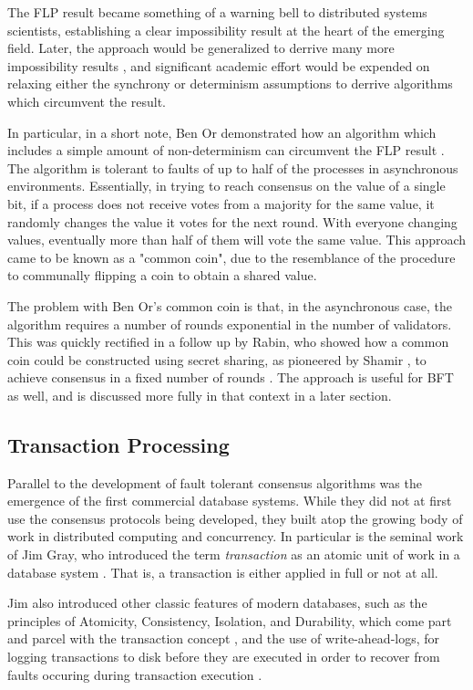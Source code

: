 The FLP result became something of a warning bell to distributed systems scientists, 
establishing a clear impossibility result at the heart of the emerging field.
Later, the approach would be generalized to derrive many more impossibility results \cite{impossibility},
and significant academic effort would be expended on relaxing either the synchrony or determinism assumptions to derrive algorithms which circumvent the result.

In particular, in a short note, 
Ben Or demonstrated how an algorithm which includes a simple amount of non-determinism can circumvent the FLP result \cite{free-choice}.
The algorithm is tolerant to faults of up to half of the processes in asynchronous environments.
Essentially, in trying to reach consensus on the value of a single bit, 
if a process does not receive votes from a majority for the same value, it randomly changes the value it votes for the next round.
With everyone changing values, eventually more than half of them will vote the same value.
This approach came to be known as a "common coin", 
due to the resemblance of the procedure to communally flipping a coin to obtain a shared value.

The problem with Ben Or's common coin is that, in the asynchronous case,
the algorithm requires a number of rounds exponential in the number of validators.
This was quickly rectified in a follow up by Rabin, who showed how a common coin
could be constructed using secret sharing, as pioneered by Shamir \cite{shamir1979share},
to achieve consensus in a fixed number of rounds \cite{rabin1983randomized}.
The approach is useful for BFT as well, and is discussed more fully in that context in a later section.

\subsection{Transaction Processing}

Parallel to the development of fault tolerant consensus algorithms was the emergence of the first commercial database systems.
While they did not at first use the consensus protocols being developed, 
they built atop the growing body of work in distributed computing and concurrency.
In particular is the seminal work of Jim Gray, who introduced the term \emph{transaction} 
as an atomic unit of work in a database system \cite{gray1981transaction}. 
That is, a transaction is either applied in full or not at all.

Jim also introduced other classic features of modern databases,
such as the principles of Atomicity, Consistency, Isolation, and Durability, 
which come part and parcel with the transaction concept \cite{gray1981transaction},
and the use of write-ahead-logs, for logging transactions to disk before they are executed
in order to recover from faults occuring during transaction execution \cite{gray1978notes}.

